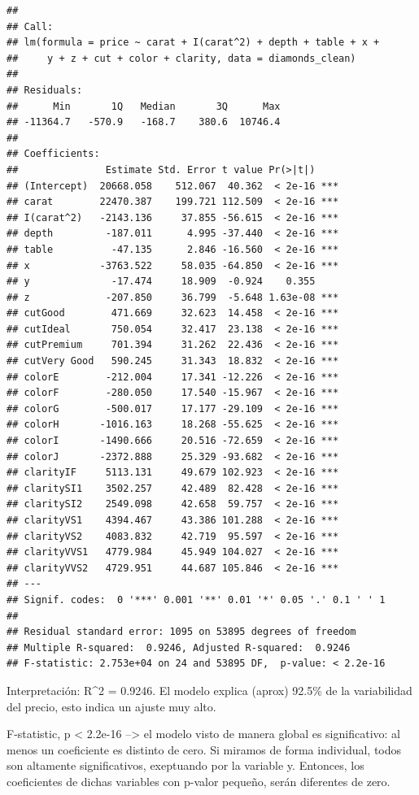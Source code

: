 \documentclass[
  spanish,
]{article}
\begin{document}
\begin{verbatim}
## 
## Call:
## lm(formula = price ~ carat + I(carat^2) + depth + table + x + 
##     y + z + cut + color + clarity, data = diamonds_clean)
## 
## Residuals:
##      Min       1Q   Median       3Q      Max 
## -11364.7   -570.9   -168.7    380.6  10746.4 
## 
## Coefficients:
##               Estimate Std. Error t value Pr(>|t|)    
## (Intercept)  20668.058    512.067  40.362  < 2e-16 ***
## carat        22470.387    199.721 112.509  < 2e-16 ***
## I(carat^2)   -2143.136     37.855 -56.615  < 2e-16 ***
## depth         -187.011      4.995 -37.440  < 2e-16 ***
## table          -47.135      2.846 -16.560  < 2e-16 ***
## x            -3763.522     58.035 -64.850  < 2e-16 ***
## y              -17.474     18.909  -0.924    0.355    
## z             -207.850     36.799  -5.648 1.63e-08 ***
## cutGood        471.669     32.623  14.458  < 2e-16 ***
## cutIdeal       750.054     32.417  23.138  < 2e-16 ***
## cutPremium     701.394     31.262  22.436  < 2e-16 ***
## cutVery Good   590.245     31.343  18.832  < 2e-16 ***
## colorE        -212.004     17.341 -12.226  < 2e-16 ***
## colorF        -280.050     17.540 -15.967  < 2e-16 ***
## colorG        -500.017     17.177 -29.109  < 2e-16 ***
## colorH       -1016.163     18.268 -55.625  < 2e-16 ***
## colorI       -1490.666     20.516 -72.659  < 2e-16 ***
## colorJ       -2372.888     25.329 -93.682  < 2e-16 ***
## clarityIF     5113.131     49.679 102.923  < 2e-16 ***
## claritySI1    3502.257     42.489  82.428  < 2e-16 ***
## claritySI2    2549.098     42.658  59.757  < 2e-16 ***
## clarityVS1    4394.467     43.386 101.288  < 2e-16 ***
## clarityVS2    4083.832     42.719  95.597  < 2e-16 ***
## clarityVVS1   4779.984     45.949 104.027  < 2e-16 ***
## clarityVVS2   4729.951     44.687 105.846  < 2e-16 ***
## ---
## Signif. codes:  0 '***' 0.001 '**' 0.01 '*' 0.05 '.' 0.1 ' ' 1
## 
## Residual standard error: 1095 on 53895 degrees of freedom
## Multiple R-squared:  0.9246, Adjusted R-squared:  0.9246 
## F-statistic: 2.753e+04 on 24 and 53895 DF,  p-value: < 2.2e-16
\end{verbatim}

Interpretación: R\^{}2 = 0.9246. El modelo explica (aprox) 92.5\% de la
variabilidad del precio, esto indica un ajuste muy alto.

F-statistic, p \textless{} 2.2e-16 --\textgreater{} el modelo visto de
manera global es significativo: al menos un coeficiente es distinto de
cero. Si miramos de forma individual, todos son altamente
significativos, exeptuando por la variable y. Entonces, los coeficientes
de dichas variables con p-valor pequeño, serán diferentes de zero.
\end{document}
